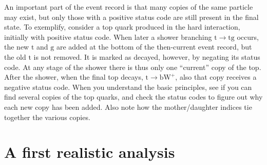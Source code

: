 \documentclass[12pt,a4paper]{article}
\renewcommand{\b}{{\mathrm b}}
\newcommand{\g}{{\mathrm g}}
\renewcommand{\t}{{\mathrm t}}
\newcommand{\W}{{\mathrm W}}
\begin{document}
An important part of the event record is that many copies of the same
particle may exist, but only those with a positive status code are still
present in the final state. To exemplify, consider a top quark
produced in the hard interaction, initially with positive status code. When
later a shower branching $\t \to \t \g$ occurs, the new $\t$ and $\g$ are
added at the bottom of the then-current event record, but the old $\t$ is
not removed. It is marked as decayed, however, by negating its status code.
At any stage of the shower there is thus only one ``current'' copy of the
top. After the shower, when the final top decays, $\t \to \b \W^+$, also
that copy receives a negative status code. When you understand the basic
principles, see if you can find several copies of the top quarks, and check
the status codes to figure out why each new copy has been added. Also note
how the mother/daughter indices tie together the various copies.

\section{A first realistic analysis}
\end{document}
